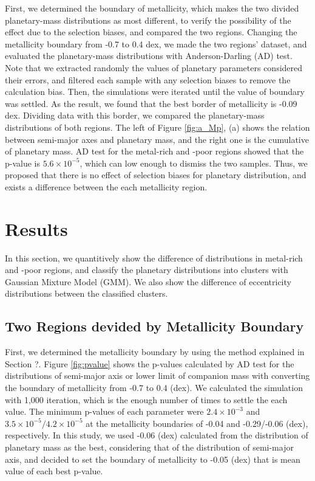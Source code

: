 \documentclass[twocolumn, dvipdfmx]{aastex62}
\begin{document}
\begin{CJK*}{UTF8}{min}
First, we determined the boundary of metallicity, which makes the two divided planetary-mass distributions as most different, to verify the possibility of the effect due to the selection biases, and compared the two regions. Changing the metallicity boundary from -0.7 to 0.4 dex, we made the two regions' dataset, and evaluated the planetary-mass distributions with Anderson-Darling (AD) test. Note that we extracted randomly the values of planetary parameters considered their errors, and filtered each sample with any selection biases to remove the calculation bias. Then, the simulations were iterated until the value of boundary was settled. As the result, we found that the best border of metallicity is -0.09 dex. Dividing data with this border, we compared the planetary-mass distributions of both regions. The left of Figure \ref{fig:a_Mp}, (a) shows the relation between semi-major axes and planetary mass, and the right one is the cumulative of planetary mass. AD test for the metal-rich and -poor regions showed that the p-value is $5.6\times10^{-5}$, which can low enough to dismiss the two samples. Thus, we proposed that there is no effect of selection biases for planetary distribution, and exists a difference between the each metallicity region.


\section{Results} \label{sec:results}

In this section, we quantitively show the difference of distributions in metal-rich and -poor regions, and classify the planetary distributions into clusters with Gaussian Mixture Model (GMM). We also show the difference of eccentricity distributions between the classified clusters.


\subsection{Two Regions devided by Metallicity Boundary} \label{subsec:mass}

First, we determined the metallicity boundary by using the method explained in Section ?. Figure \ref{fig:pvalue} shows the p-values calculated by AD test for the distributions of semi-major axis or lower limit of companion mass with converting the boundary of metallicity from -0.7 to 0.4 (dex). We calculated the simulation with 1,000 iteration, which is the enough number of times to settle the each value. The minimum p-values of each parameter were $2.4\times10^{-3}$ and $3.5\times10^{-5}/4.2\times10^{-5}$ at the metallicity boundaries of -0.04 and -0.29/-0.06 (dex), respectively. In this study, we used -0.06 (dex) calculated from the distribution of planetary mass as the best, considering that of the distribution of semi-major axis, and decided to set the boundary of metallicity to -0.05 (dex) that is mean value of each best p-value.


\end{CJK*}
\end{document}
